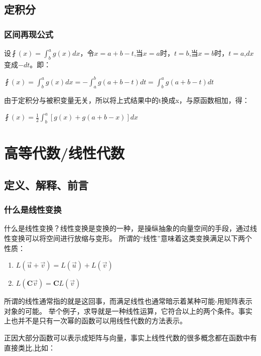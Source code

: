 \documentclass[UTF8]{ctexbook}
\newcommand{\defFunction}[1]{\fint(#1)}
\newcommand{\definiteIntegral}[2]{\int^{#1}_{#2}}
\begin{document}
{{{}%


\subsection{定积分}{

  \subsubsection{区间再现公式}{
    设$\defFunction{x} = \definiteIntegral{a}{b}g(x)dx$，令$x = a + b - t$,当$x = a$时，$t = b$,当$x = b$时，$t = a$,$dx$变成$-dt$。即：

    $\defFunction{x} = \definiteIntegral{a}{b}g(x)dx = -\definiteIntegral{b}{a}g(a+b-t)dt = \definiteIntegral{a}{b}g(a + b - t)dt$

    由于定积分与被积变量无关，所以将上式结果中的t换成x，与原函数相加，得：

    $\defFunction{x} = \frac{1}{2}\definiteIntegral{a}{b}[g(x) + g(a + b - x)]dx$
  }%

}%

}%

\section{高等代数/线性代数}{
\subsection{定义、解释、前言}{
\subsubsection{什么是线性变换}{
  什么是线性变换？线性变换是变换的一种，是操纵抽象的向量空间的手段，通过线性变换可以将空间进行放缩与变形。
  所谓的“线性”意味着这类变换满足以下两个性质：

  \begin{enumerate}
    \item $L(\vec{u}+\vec{v}) = L(\vec{u})+L(\vec{v})$
    \item $L(\mathbf{C}\vec{v}) = \mathbf{C}L(\vec{v})$
  \end{enumerate}

  所谓的线性通常指的就是这回事，而满足线性也通常暗示着某种可能-用矩阵表示对象的可能。
  举个例子，求导就是一种线性运算，它符合以上的两个条件。事实上也并不是只有一次幂的函数可以用线性代数的方法表示。

  正因大部分函数可以表示成矩阵与向量，事实上线性代数的很多概念都在函数中有直接类比,比如：

}}}}
\end{document}
